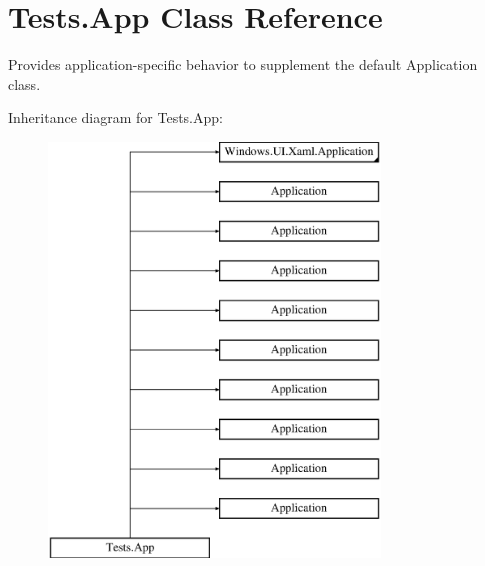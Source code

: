 \hypertarget{class_tests_1_1_app}{}\section{Tests.\+App Class Reference}
\label{class_tests_1_1_app}


Provides application-\/specific behavior to supplement the default Application class.  


Inheritance diagram for Tests.\+App\+:\begin{figure}[H]
\begin{center}
\leavevmode
\includegraphics[height=11.000000cm]{class_tests_1_1_app}
\end{center}
\end{figure}

